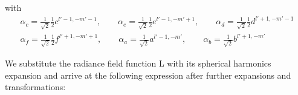 \documentclass[10pt]{scrartcl}
\begin{document}
with 
\begin{align*}
\alpha_c = \frac{1}{\sqrt{2}}\frac{1}{2}c^{{l'-1,-m'-1}}
,\qquad
\alpha_e = \frac{1}{\sqrt{2}}\frac{1}{2}e^{{l'-1,-m'+1}}
,\qquad
\alpha_d = \frac{1}{\sqrt{2}}\frac{1}{2}d^{{l'+1,-m'-1}}
\\
\alpha_f = \frac{1}{\sqrt{2}}\frac{1}{2}f^{{l'+1,-m'+1}}
,\qquad
\alpha_a = \frac{1}{\sqrt{2}}a^{{l'-1,-m'}}
,\qquad
\alpha_b = \frac{1}{\sqrt{2}}b^{{l'+1,-m'}}
\end{align*}

We substitute the radiance field function L with its spherical harmonics expansion and arrive
at the following expression after further expansions and transformations:
\end{document}
